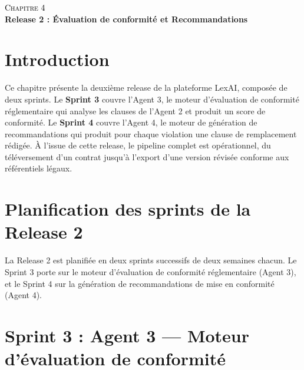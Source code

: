 \setcounter{chapter}{4}
\setcounter{section}{0}
\setcounter{figure}{0}
\setcounter{table}{0}

\thispagestyle{empty}
\begin{center}
    \vspace*{\fill}
    {\fontsize{40pt}{48pt}\selectfont \textcolor{black}{\textsc{Chapitre 4}}}\\[2em]
    {\fontsize{22pt}{26pt}\selectfont \textbf{Release 2 : Évaluation de conformité et Recommandations}}
    \vspace*{\fill}
\end{center}
\clearpage


\section{Introduction}

Ce chapitre présente la deuxième release de la plateforme LexAI, composée de deux sprints. Le \textbf{Sprint 3} couvre l'Agent 3, le moteur d'évaluation de conformité réglementaire qui analyse les clauses de l'Agent 2 et produit un score de conformité. Le \textbf{Sprint 4} couvre l'Agent 4, le moteur de génération de recommandations qui produit pour chaque violation une clause de remplacement rédigée. À l'issue de cette release, le pipeline complet est opérationnel, du téléversement d'un contrat jusqu'à l'export d'une version révisée conforme aux référentiels légaux.

\section{Planification des sprints de la Release 2}

La Release 2 est planifiée en deux sprints successifs de deux semaines chacun.
Le Sprint 3 porte sur le moteur d'évaluation de conformité réglementaire (Agent 3),
et le Sprint 4 sur la génération de recommandations de mise en conformité (Agent 4).

\section{Sprint 3 : Agent 3 — Moteur d'évaluation de conformité}

